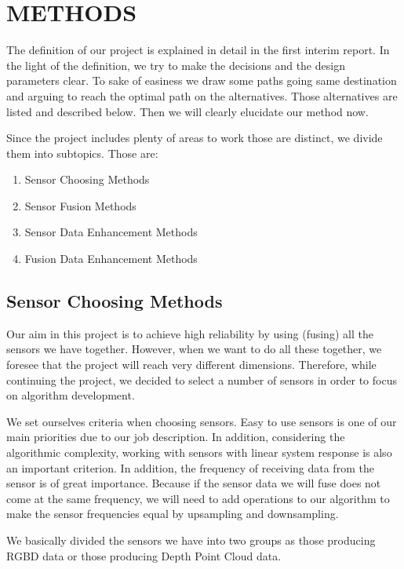 \documentclass[12pt]{article}
\begin{document}
\section{METHODS}

The definition of our project is explained in detail in the first interim report. In the light of the definition, we try to make the decisions and the design parameters clear. To sake of easiness we draw some paths going same destination and arguing to reach the optimal path on the alternatives. Those alternatives are listed and described below. Then we will clearly elucidate our method now.

Since the project includes plenty of areas to work those are distinct, we divide them into subtopics. Those are:

\begin{enumerate}
    \item Sensor Choosing Methods
    \item Sensor Fusion Methods
    \item Sensor Data Enhancement Methods
    \item Fusion Data Enhancement Methods
\end{enumerate}

\subsection{Sensor Choosing Methods}

Our aim in this project is to achieve high reliability by using (fusing) all the sensors we have together. However, when we want to do all these together, we foresee that the project will reach very different dimensions. Therefore, while continuing the project, we decided to select a number of sensors in order to focus on algorithm development.

We set ourselves criteria when choosing sensors. Easy to use sensors is one of our main priorities due to our job description. In addition, considering the algorithmic complexity, working with sensors with linear system response is also an important criterion. In addition, the frequency of receiving data from the sensor is of great importance. Because if the sensor data we will fuse does not come at the same frequency, we will need to add operations to our algorithm to make the sensor frequencies equal by upsampling and downsampling.

We basically divided the sensors we have into two groups as those producing RGBD data or those producing Depth Point Cloud data.
\end{document}
